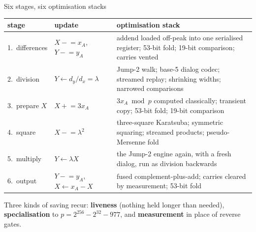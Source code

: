 \documentclass[aspectratio=169,11pt]{beamer}
\begin{document}
\begin{frame}{Six stages, six optimisation stacks}
  \centering\footnotesize
  \renewcommand{\arraystretch}{1.04}
  \begin{tabular}{@{}l>{\raggedright}p{31mm}>{\raggedright\arraybackslash}p{84mm}@{}}
    \toprule
    stage & update & optimisation stack \\
    \midrule
    1.\ differences & $X\mathrel{-}=x_A$, \ $Y\mathrel{-}=y_A$ & addend loaded off-peak into one serialised register; 53-bit fold; 19-bit comparison; carries vented \\
    2.\ division & $Y\leftarrow d_y/d_x=\lambda$ & Jump-2 walk; base-5 dialog codec; streamed replay; shrinking widths; narrowed comparisons \\
    3.\ prepare $X$ & $X\mathrel{+}=3x_A$ & $3x_A\bmod p$ computed classically; transient copy; 53-bit fold; 19-bit comparison \\
    4.\ square & $X\mathrel{-}=\lambda^2$ & three-square Karatsuba; symmetric squaring; streamed products; pseudo-Mersenne fold \\
    5.\ multiply & $Y\leftarrow\lambda X$ & the Jump-2 engine again, with a fresh dialog, run as division backwards \\
    6.\ output & $Y\mathrel{-}=y_A$, \ $X\leftarrow x_A-X$ & fused complement-plus-add; carries cleared by measurement; 53-bit fold \\
    \bottomrule
  \end{tabular}\par
  \vskip1mm
  \raggedright{\small Three kinds of saving recur: \textbf{liveness} (nothing held longer than needed), \textbf{specialisation} to $p=2^{256}-2^{32}-977$, and \textbf{measurement} in place of reverse gates.}
\end{frame}
\end{document}
